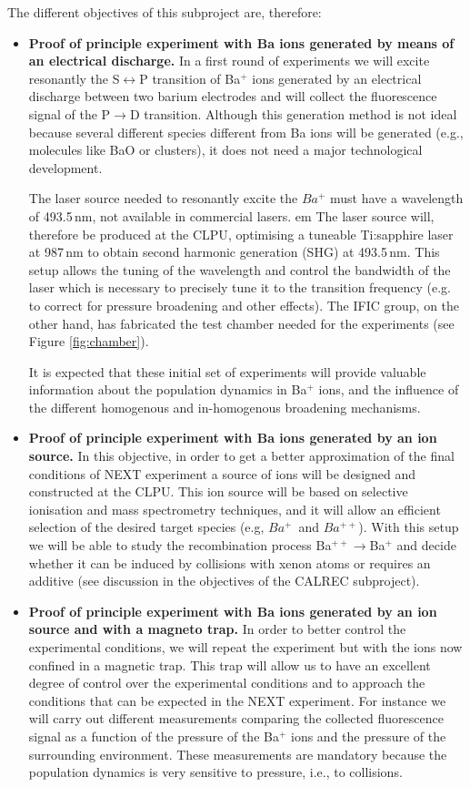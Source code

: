 The different objectives of this subproject are, therefore:

\begin{itemize}
	\item \textbf{Proof of principle experiment with Ba ions generated by means of an electrical discharge.}
In a first round of experiments we will excite resonantly the S$\leftrightarrow$P transition of Ba$^+$ ions generated by an electrical discharge between two barium electrodes and will collect the fluorescence signal of the P$\rightarrow$D transition. Although this generation method is not ideal because several different species different from Ba ions will be generated (e.g., molecules like BaO or clusters), it does not need a major technological development. 

The laser source needed to resonantly excite the $Ba^{+}$ must have a wavelength of 493.5\,nm, not available in commercial lasers. {em The laser source will, therefore be produced at the CLPU}, optimising a tuneable Ti:sapphire laser at 987\,nm to obtain second harmonic generation (SHG) at 493.5\,nm. This setup allows the tuning of the wavelength and control the bandwidth of the laser which is necessary to precisely tune it to the transition frequency (e.g. to correct for pressure broadening and other effects). The IFIC group, on the other hand, has fabricated the test chamber needed for the experiments 
(see Figure \ref{fig:chamber}). 

It is expected that these initial set of experiments will provide valuable information about the population dynamics in Ba$^+$ ions, and the influence of the different homogenous and in-homogenous broadening mechanisms. 
	
	\item \textbf{Proof of principle experiment with Ba ions generated by an ion source.}	
In this objective, in order to get a better approximation of the final conditions of NEXT experiment a source of ions will be designed and constructed at the CLPU. This ion source will be based on selective ionisation and mass spectrometry techniques, and it will allow an efficient selection of the desired target species (e.g, $Ba^{+}$~and $Ba^{++}$). With this setup we will be able to study the recombination process Ba$^{++}\rightarrow$Ba$^{+}$ and decide whether it can be induced by collisions with xenon atoms or requires an additive (see discussion in the objectives of the CALREC subproject). 
	
	\item \textbf{Proof of principle experiment with Ba ions generated by an ion source and with a magneto trap.}	
 In order to better control the experimental conditions, we will repeat the experiment but with the ions now confined in a magnetic trap. This trap will allow us to have an excellent degree of control over the experimental conditions and to approach the conditions that can be expected in the NEXT experiment. For instance we will carry out different measurements comparing the collected fluorescence signal as a function of the pressure of the Ba$^+$ ions and the pressure of the surrounding environment. These measurements are mandatory because the population dynamics is very sensitive to pressure, i.e., to collisions. 
	

\end{itemize}

